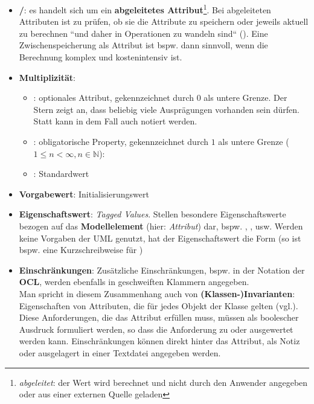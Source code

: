 \begin{itemize}
\begin{itemize}
        \item \textbf{/}: es handelt sich um ein \textbf{abgeleitetes Attribut}\footnote{
            \textit{abgeleitet}: der Wert wird berechnet und nicht durch den Anwender angegeben oder aus einer externen Quelle geladen
        }. Bei abgeleiteten Attributen ist zu prüfen, ob sie  die Attribute zu speichern oder jeweils aktuell zu berechnen ``und daher in Operationen zu wandeln sind`` (\cite[414]{Bal05}). Eine Zwischenspeicherung als Attribut ist bspw. dann sinnvoll, wenn die Berechnung komplex und kostenintensiv ist.
        \item \textbf{Multiplizität}:
        \begin{itemize}
            \item \code{[0..*]}: optionales Attribut, gekennzeichnet durch $0$ als untere Grenze.
            Der Stern \code{*} zeigt an, dass beliebig viele Ausprägungen vorhanden sein dürfen.
            Statt \code{[0..*]} kann in dem Fall auch \code{[*]} notiert werden.
            \item \code{[1..n]}: obligatorische Property, gekennzeichnet durch $1$ als untere Grenze ($1 \leq n < \infty, n \in \mathbb{N}$):
            \item \code{[1]}: Standardwert
        \end{itemize}
        \item \textbf{Vorgabewert}: Initialisierungswert
        \item \textbf{Eigenschaftswert}: \textit{Tagged Values}.
        Stellen besondere Eigenschaftswerte bezogen auf das \textbf{Modellelement} (hier: \textit{Attribut}) dar, {bspw.} , ,  usw. Werden keine Vorgaben der UML genutzt, hat der Eigenschaftswert die Form  (so ist bspw.  eine Kurzschreibweise für  )
        \item \textbf{Einschränkungen}: Zusätzliche Einschränkungen, bspw. in der Notation der \textbf{OCL}, werden ebenfalls in geschweiften Klammern angegeben.\\
        Man spricht in diesem Zusammenhang auch von \textbf{(Klassen-)Invarianten}: Eigenschaften von Attributen, die für jedes Objekt der Klasse gelten (vgl.\cite[338]{Oes05}).
        Diese Anforderungen, die das Attribut erfüllen muss, müssen als boolescher Ausdruck formuliert werden, so dass die Anforderung zu  oder  ausgewertet werden kann.
        Einschränkungen können direkt hinter das Attribut, als Notiz oder ausgelagert in einer Textdatei angegeben werden.
    \end{itemize}

\end{itemize}

